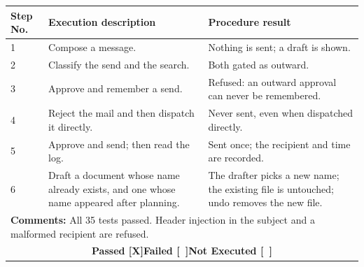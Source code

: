\documentclass{FastFyp}
\begin{document}
{\begin{longtable}{|p{2.4cm}p{5.0cm}p{2.4cm}p{3.8cm}|}
\multicolumn{1}{|p{2.4cm}|}{\textbf{Step No.}} &
  \multicolumn{1}{p{5.0cm}|}{\textbf{Execution description}} &
  \multicolumn{2}{p{6.6cm}|}{\textbf{Procedure result}} \\ \hline
\multicolumn{1}{|p{2.4cm}|}{1} & \multicolumn{1}{p{5.0cm}|}{Compose a message.} & \multicolumn{2}{p{6.6cm}|}{Nothing is sent; a draft is shown.} \\ \hline
\multicolumn{1}{|p{2.4cm}|}{2} & \multicolumn{1}{p{5.0cm}|}{Classify the send and the search.} & \multicolumn{2}{p{6.6cm}|}{Both gated as outward.} \\ \hline
\multicolumn{1}{|p{2.4cm}|}{3} & \multicolumn{1}{p{5.0cm}|}{Approve and remember a send.} & \multicolumn{2}{p{6.6cm}|}{Refused: an outward approval can never be remembered.} \\ \hline
\multicolumn{1}{|p{2.4cm}|}{4} & \multicolumn{1}{p{5.0cm}|}{Reject the mail and then dispatch it directly.} & \multicolumn{2}{p{6.6cm}|}{Never sent, even when dispatched directly.} \\ \hline
\multicolumn{1}{|p{2.4cm}|}{5} & \multicolumn{1}{p{5.0cm}|}{Approve and send; then read the log.} & \multicolumn{2}{p{6.6cm}|}{Sent once; the recipient and time are recorded.} \\ \hline
\multicolumn{1}{|p{2.4cm}|}{6} & \multicolumn{1}{p{5.0cm}|}{Draft a document whose name already exists, and one whose name appeared after planning.} & \multicolumn{2}{p{6.6cm}|}{The drafter picks a new name; the existing file is untouched; undo removes the new file.} \\ \hline
\multicolumn{4}{|p{14.8cm}|}{\textbf{Comments:} All 35 tests passed. Header injection in the subject and a malformed recipient are refused.} \\ \hline
\multicolumn{4}{|c|}{\textbf{Passed [X]\quad Failed [\ ]\quad Not Executed [\ ]}} \\ \hline
\end{longtable}
}
\end{document}

